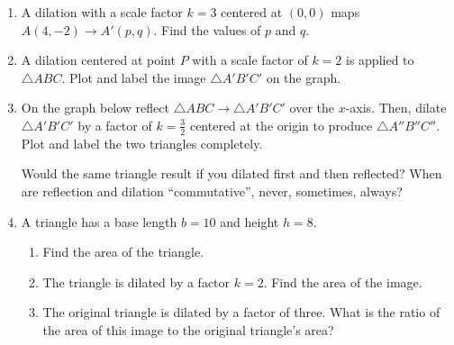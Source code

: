 \begin{enumerate}
\item A dilation with a scale factor $k=3$ centered at $(0,0)$ maps $A(4,-2) \rightarrow A'(p,q)$. Find the values of $p$ and $q$. \vspace{2.5cm}

\item A dilation centered at point $P$ with a scale factor of $k=2$ is applied to $\triangle ABC$. Plot and label the image $\triangle A'B'C'$ on the graph.
\begin{center}
  \end{center}

\newpage
\item On the graph below reflect $\triangle ABC \rightarrow \triangle A'B'C'$ over the $x$-axis. Then, dilate $\triangle A'B'C'$ by a factor of $\displaystyle k=\frac{3}{2}$ centered at the origin to produce $\triangle A''B''C''$. Plot and label the two triangles completely.
\begin{center}
\end{center}
Would the same triangle result if you dilated first and then reflected? When are reflection and dilation ``commutative'', never, sometimes, always?

\item A triangle has a base length $b=10$ and height $h=8$. 
\begin{enumerate}[itemsep=1.5cm]
  \item Find the area of the triangle.
  \item The triangle is dilated by a factor $k=2$. Find the area of the image.
  \item The original triangle is dilated by a factor of three. What is the ratio of the area of this image to the original triangle's area?
\end{enumerate}

\end{enumerate}

